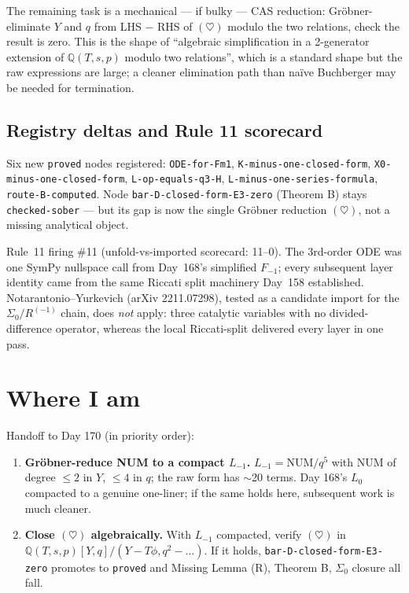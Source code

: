 \documentclass[11pt]{amsart}
\begin{document}
The remaining task is a mechanical --- if bulky --- CAS reduction:
Gr\"obner-eliminate $Y$ and $q$ from LHS $-$ RHS of $(\heartsuit)$ modulo
the two relations, check the result is zero. This is the shape of
``algebraic simplification in a 2-generator extension of $\mathbb{Q}(T, s, p)$
modulo two relations'', which is a standard shape but the raw expressions
are large; a cleaner elimination path than na\"ive Buchberger may be
needed for termination.

\subsection{Registry deltas and Rule 11 scorecard}

Six new \texttt{proved} nodes registered:
\texttt{ODE-for-Fm1},
\texttt{K-minus-\allowbreak one-closed-form},
\texttt{X0-minus-\allowbreak one-closed-form},
\texttt{L-op-equals-q3-H},
\texttt{L-minus-\allowbreak one-series-formula},
\texttt{route-B-computed}.
Node \texttt{bar-D-closed-form-E3-zero} (Theorem B) stays \texttt{checked-sober}
--- but its gap is now the single Gr\"obner reduction $(\heartsuit)$, not
a missing analytical object.

Rule~11 firing \#11 (unfold-vs-imported scorecard: 11--0). The 3rd-order
ODE was one SymPy nullspace call from Day~168's simplified $F_{-1}$; every
subsequent layer identity came from the same Riccati split machinery
Day~158 established. Notarantonio--Yurkevich (arXiv 2211.07298), tested
as a candidate import for the $\Sigma_0/R^{(-1)}$ chain, does \emph{not}
apply: three catalytic variables with no divided-difference operator,
whereas the local Riccati-split delivered every layer in one pass.

\section{Where I am}
\label{sec:handoff}

Handoff to Day 170 (in priority order):
\begin{enumerate}[leftmargin=2em, label=\arabic*.]
    \item \textbf{Gr\"obner-reduce NUM to a compact $L_{-1}$.} $L_{-1} = \mathrm{NUM}/q^5$ with $\mathrm{NUM}$ of degree $\le 2$ in $Y$, $\le 4$ in $q$; the raw form has $\sim$20 terms. Day 168's $L_0$ compacted to a genuine one-liner; if the same holds here, subsequent work is much cleaner.
    \item \textbf{Close $(\heartsuit)$ algebraically.} With $L_{-1}$ compacted, verify $(\heartsuit)$ in $\mathbb{Q}(T, s, p)[Y, q]/(Y - T\phi, q^2 - \ldots)$. If it holds, \texttt{bar-D-closed-form-E3-zero} promotes to \texttt{proved} and Missing Lemma (R), Theorem B, $\Sigma_0$ closure all fall.
\end{enumerate}
\end{document}
